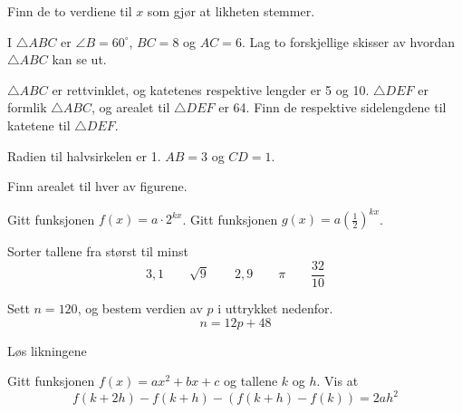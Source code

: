 Finn de to verdiene til $x$ som gjør at likheten stemmer. \os
{}

I $\triangle ABC$ er $\angle B= 60^\circ$, $BC=8$ og $AC=6$. Lag to forskjellige skisser av hvordan $\triangle ABC$ kan se ut.


$\triangle ABC$ er rettvinklet, og katetenes respektive lengder er 5 og 10. $\triangle DEF$ er formlik $\triangle ABC$, og arealet til $\triangle DEF$ er 64. Finn de respektive sidelengdene til katetene til $\triangle DEF$.

Radien til halvsirkelen er 1. $AB=3$ og $CD=1$.



Finn arealet til hver av figurene.


Gitt funksjonen $f(x)=a\cdot2^{kx}$.
Gitt funksjonen $g(x)=a\left(\frac{1}{2}\right)^{kx}$.

Sorter tallene fra størst til minst
\[ 3,1\qquad\sqrt{9}\qquad2,9\qquad\pi \qquad \frac{32}{10} \]

Sett $ n=120 $, og bestem verdien av $ p $ i uttrykket nedenfor. 
\[ n = 12p + 48 \]

Løs likningene \os
{}

Gitt funksjonen $f(x)=a x^2+bx+c$ og tallene $k$ og $h$. Vis at
\[ f(k+2h)-f(k+h)-\left(f(k+h)-f(k)\right)=2ah^2 \]

